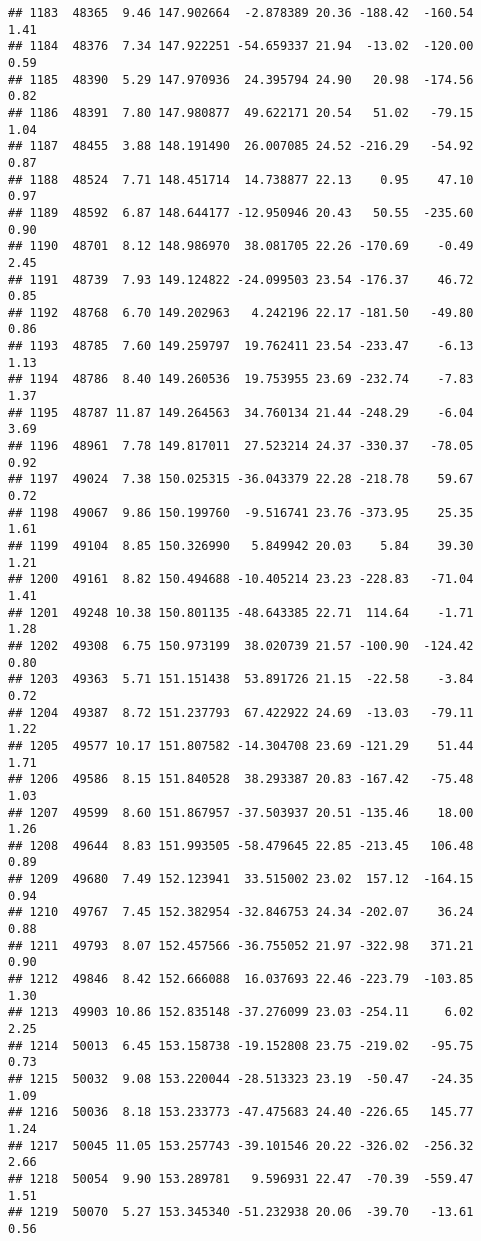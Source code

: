 \documentclass[]{article}
\begin{document}
\begin{verbatim}
## 1183  48365  9.46 147.902664  -2.878389 20.36 -188.42  -160.54  1.41
## 1184  48376  7.34 147.922251 -54.659337 21.94  -13.02  -120.00  0.59
## 1185  48390  5.29 147.970936  24.395794 24.90   20.98  -174.56  0.82
## 1186  48391  7.80 147.980877  49.622171 20.54   51.02   -79.15  1.04
## 1187  48455  3.88 148.191490  26.007085 24.52 -216.29   -54.92  0.87
## 1188  48524  7.71 148.451714  14.738877 22.13    0.95    47.10  0.97
## 1189  48592  6.87 148.644177 -12.950946 20.43   50.55  -235.60  0.90
## 1190  48701  8.12 148.986970  38.081705 22.26 -170.69    -0.49  2.45
## 1191  48739  7.93 149.124822 -24.099503 23.54 -176.37    46.72  0.85
## 1192  48768  6.70 149.202963   4.242196 22.17 -181.50   -49.80  0.86
## 1193  48785  7.60 149.259797  19.762411 23.54 -233.47    -6.13  1.13
## 1194  48786  8.40 149.260536  19.753955 23.69 -232.74    -7.83  1.37
## 1195  48787 11.87 149.264563  34.760134 21.44 -248.29    -6.04  3.69
## 1196  48961  7.78 149.817011  27.523214 24.37 -330.37   -78.05  0.92
## 1197  49024  7.38 150.025315 -36.043379 22.28 -218.78    59.67  0.72
## 1198  49067  9.86 150.199760  -9.516741 23.76 -373.95    25.35  1.61
## 1199  49104  8.85 150.326990   5.849942 20.03    5.84    39.30  1.21
## 1200  49161  8.82 150.494688 -10.405214 23.23 -228.83   -71.04  1.41
## 1201  49248 10.38 150.801135 -48.643385 22.71  114.64    -1.71  1.28
## 1202  49308  6.75 150.973199  38.020739 21.57 -100.90  -124.42  0.80
## 1203  49363  5.71 151.151438  53.891726 21.15  -22.58    -3.84  0.72
## 1204  49387  8.72 151.237793  67.422922 24.69  -13.03   -79.11  1.22
## 1205  49577 10.17 151.807582 -14.304708 23.69 -121.29    51.44  1.71
## 1206  49586  8.15 151.840528  38.293387 20.83 -167.42   -75.48  1.03
## 1207  49599  8.60 151.867957 -37.503937 20.51 -135.46    18.00  1.26
## 1208  49644  8.83 151.993505 -58.479645 22.85 -213.45   106.48  0.89
## 1209  49680  7.49 152.123941  33.515002 23.02  157.12  -164.15  0.94
## 1210  49767  7.45 152.382954 -32.846753 24.34 -202.07    36.24  0.88
## 1211  49793  8.07 152.457566 -36.755052 21.97 -322.98   371.21  0.90
## 1212  49846  8.42 152.666088  16.037693 22.46 -223.79  -103.85  1.30
## 1213  49903 10.86 152.835148 -37.276099 23.03 -254.11     6.02  2.25
## 1214  50013  6.45 153.158738 -19.152808 23.75 -219.02   -95.75  0.73
## 1215  50032  9.08 153.220044 -28.513323 23.19  -50.47   -24.35  1.09
## 1216  50036  8.18 153.233773 -47.475683 24.40 -226.65   145.77  1.24
## 1217  50045 11.05 153.257743 -39.101546 20.22 -326.02  -256.32  2.66
## 1218  50054  9.90 153.289781   9.596931 22.47  -70.39  -559.47  1.51
## 1219  50070  5.27 153.345340 -51.232938 20.06  -39.70   -13.61  0.56

\end{verbatim}
\end{document}
